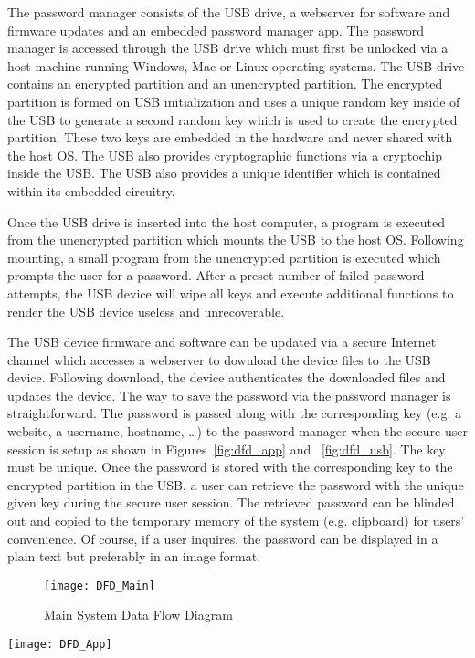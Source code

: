 The password manager consists of the USB drive, a webserver for software and
firmware updates and an embedded password manager app.  The password manager is
accessed through the USB drive which must first be unlocked via a host machine
running Windows, Mac or Linux operating systems. The USB drive contains an
encrypted partition and an unencrypted partition.  The encrypted partition is
formed on USB initialization and uses a unique random key inside of the USB to
generate a second random key which is used to create the encrypted
partition. These two keys are embedded in the hardware and never shared with the
host OS.  The USB also
provides cryptographic functions via a cryptochip inside the USB.  The USB also
provides a unique identifier which is contained within its embedded circuitry.
\par Once the USB drive is inserted into the host computer, a program is
executed from the unencrypted partition which mounts the USB to the host OS.
Following mounting, a small program from the unencrypted partition is executed
which prompts the user for a password. After a preset number of failed password
attempts, the USB device will wipe all keys and execute additional functions to
render the USB device useless and unrecoverable.
\par The USB device firmware and software can be updated via a secure Internet
channel which accesses a webserver to download the device files to the USB
device.  Following download, the device authenticates the downloaded files and
updates the device.
The way to save the password via the password manager is straightforward. The
password is passed along with the corresponding key (e.g. a website, a username,
hostname, \dots) to the password manager when the secure user session is
setup as shown in Figures~\ref{fig:dfd_app} and ~\ref{fig:dfd_usb}. The key
must be unique. Once
the password is stored with the corresponding key to the encrypted partition in
the USB, a user can retrieve the password with the unique given key during the
secure user session. The retrieved password can be blinded out and copied to the
temporary memory of the system (e.g. clipboard) for users' convenience. Of
course, if a user inquires, the password can be displayed in a plain text but
preferably in an image format.

\begin{figure}
    \centering
    \texttt{[image: DFD\_Main]}
    \caption{Main System Data Flow Diagram}
    \label{fig:dfd_main}
\end{figure}
\begin{figure*}
    \centering
    \texttt{[image: DFD\_App]}
    \caption{System Data Flow Diagram in the App side}
    \label{fig:dfd_app}
\end{figure*}

